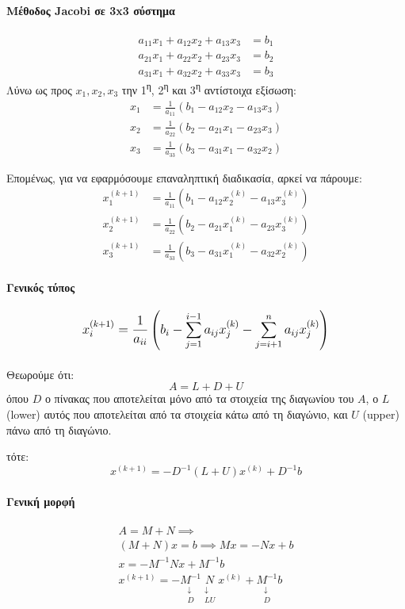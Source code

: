 \documentclass[11pt,a4paper,notitlepage,fleqn,final]{article}
\begin{document}
\paragraph{Μέθοδος Jacobi σε 3x3 σύστημα}
\begin{align*}
	a_{11}x_1+a_{12}x_2+a_{13}x_3 &= b_1 \\
	a_{21}x_1+a_{22}x_2+a_{23}x_3 &= b_2 \\
	a_{31}x_1+a_{32}x_2+a_{33}x_3 &= b_3
\end{align*}
Λύνω ως προς \( x_1,x_2,x_3 \) την 1\textsuperscript{η},
2\textsuperscript{η} και 3\textsuperscript{η} αντίστοιχα
εξίσωση:
\begin{align*}
	x_1&=\frac{1}{a_{11}}\left(b_1
	- a_{12}x_2-a_{13}x_3\right) \\
	x_2 &= \frac{1}{a_{22}}\left(b_2
	-a_{21}x_1-a_{23}x_3\right) \\
	x_3 &= \frac{1}{a_{33}}\left(b_3
	-a_{31}x_1-a_{32}x_2\right)
\end{align*}

Επομένως, για να εφαρμόσουμε επαναληπτική διαδικασία, αρκεί να
πάρουμε:
\begin{align*}
x_1^{(k+1)}&=\frac{1}{a_{11}}\left(b_1
- a_{12}x_2^{(k)}-a_{13}x_3^{(k)}\right) \\
x_2^{(k+1)} &= \frac{1}{a_{22}}\left(b_2
-a_{21}x_1^{(k)}-a_{23}x_3^{(k)}\right) \\
x_3^{(k+1)} &= \frac{1}{a_{33}}\left(b_3
-a_{31}x_1^{(k)}-a_{32}x_2^{(k)}\right)
\end{align*}

\paragraph{Γενικός τύπος}
\[
\mathlarger{
x_i^{(k+1)} = \frac{1}{a_{ii}}\left(b_i
- \sum_{j=1}^{i-1} a_{ij}x_j^{(k)}
- \sum_{j=i+1}^{n} a_{ij}x_j^{(k)}
\right)
}
\]

\paragraph{}
Θεωρούμε ότι:
\[
A = L + D + U
\]
όπου \( D \) ο πίνακας που αποτελείται μόνο από τα στοιχεία
της διαγωνίου του \( A \), ο \( L \) (lower) αυτός που αποτελείται
από τα στοιχεία κάτω από τη διαγώνιο, και \( U \) (upper) πάνω
από τη διαγώνιο.

τότε:
\[
x^{(k+1)} = -D^{-1}(L+U)x^{(k)} + D^{-1}b
\]

\paragraph{Γενική μορφή}
\begin{gather*}
	A = M +N \implies \\
	(M+N)x = b \implies Mx = -Nx + b\\
	\boxed{x = -M^{-1}Nx + M^{-1}b } \\
	x^{(k+1)} = -\underset{\substack{\downarrow\\D}}{M^{-1}}
	\underset{\substack{\downarrow\\LU}}{N} x^{(k)}
	+ \underset{\substack{\downarrow\\D}}{M^{-1}} b
\end{gather*}
\end{document}
